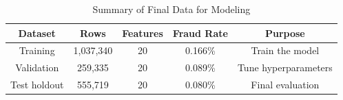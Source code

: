 \begin{table}[H]
\centering
\caption{Summary of Final Data for Modeling}
\begin{tabular}{|c|c|c|c|c|}
\hline
\textbf{Dataset} & \textbf{Rows} & \textbf{Features} & \textbf{Fraud Rate} & \textbf{Purpose} \\
\hline
Training & 1,037,340 & 20 & 0.166\% & Train the model \\
\hline
Validation & 259,335 & 20 & 0.089\% & Tune hyperparameters \\
\hline
Test holdout & 555,719 & 20 & 0.080\% & Final evaluation \\
\hline
\end{tabular}
\end{table}

